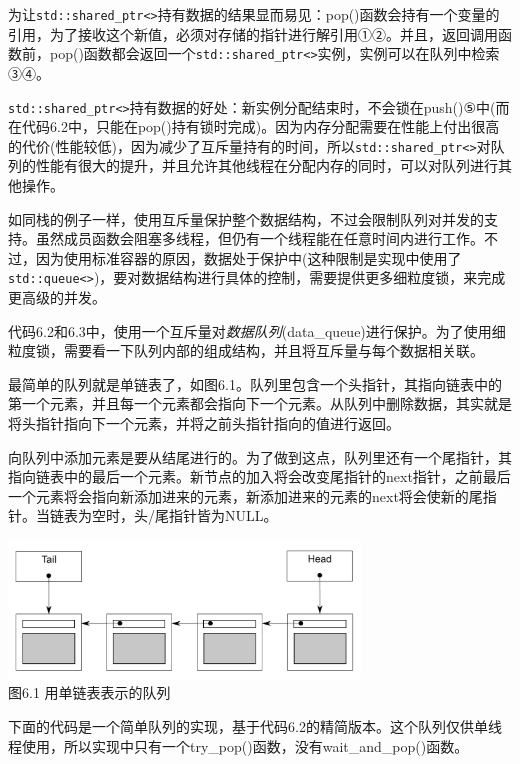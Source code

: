 为让\texttt{std::shared\_ptr<>}持有数据的结果显而易见：pop()函数会持有一个变量的引用，为了接收这个新值，必须对存储的指针进行解引用①②。并且，返回调用函数前，pop()函数都会返回一个\texttt{std::shared\_ptr<>}实例，实例可以在队列中检索③④。

\texttt{std::shared\_ptr<>}持有数据的好处：新实例分配结束时，不会锁在push()⑤中(而在代码6.2中，只能在pop()持有锁时完成)。因为内存分配需要在性能上付出很高的代价(性能较低)，因为减少了互斥量持有的时间，所以\texttt{std::shared\_ptr<>}对队列的性能有很大的提升，并且允许其他线程在分配内存的同时，可以对队列进行其他操作。

如同栈的例子一样，使用互斥量保护整个数据结构，不过会限制队列对并发的支持。虽然成员函数会阻塞多线程，但仍有一个线程能在任意时间内进行工作。不过，因为使用标准容器的原因，数据处于保护中(这种限制是实现中使用了\texttt{std::queue<>})，要对数据结构进行具体的控制，需要提供更多细粒度锁，来完成更高级的并发。


代码6.2和6.3中，使用一个互斥量对\textit{数据队列}(data\_queue)进行保护。为了使用细粒度锁，需要看一下队列内部的组成结构，并且将互斥量与每个数据相关联。

最简单的队列就是单链表了，如图6.1。队列里包含一个头指针，其指向链表中的第一个元素，并且每一个元素都会指向下一个元素。从队列中删除数据，其实就是将头指针指向下一个元素，并将之前头指针指向的值进行返回。

向队列中添加元素是要从结尾进行的。为了做到这点，队列里还有一个尾指针，其指向链表中的最后一个元素。新节点的加入将会改变尾指针的next指针，之前最后一个元素将会指向新添加进来的元素，新添加进来的元素的next将会使新的尾指针。当链表为空时，头/尾指针皆为NULL。

\begin{center}
    \includegraphics[width=0.7\textwidth]{content/chapter06/images/6-1.png}\\
    图6.1 用单链表表示的队列
\end{center}

下面的代码是一个简单队列的实现，基于代码6.2的精简版本。这个队列仅供单线程使用，所以实现中只有一个try\_pop()函数，没有wait\_and\_pop()函数。

